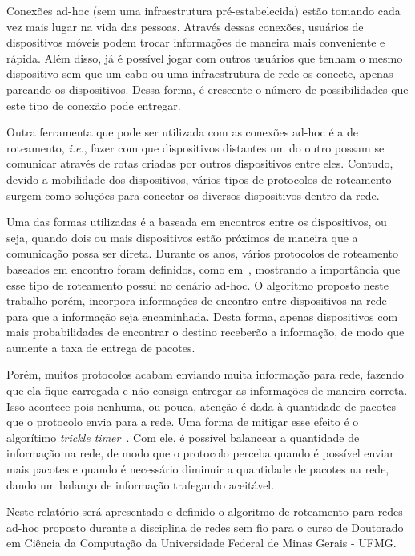 \documentclass[11pt,a4paper,titlepage]{article}
\begin{document}
Conexões ad-hoc (sem uma infraestrutura pré-estabelecida) estão tomando cada vez mais lugar na vida das pessoas.
Através dessas conexões, usuários de dispositivos móveis podem trocar informações de maneira mais conveniente e rápida.
Além disso, já é possível jogar com outros usuários que tenham o mesmo dispositivo sem que um cabo ou uma infraestrutura de rede os conecte, apenas pareando os dispositivos.
Dessa forma, é crescente o número de possibilidades que este tipo de conexão pode entregar.

Outra ferramenta que pode ser utilizada com as conexões ad-hoc é a de roteamento, \textit{i.e.}, fazer com que dispositivos distantes um do outro possam se comunicar através de rotas criadas por outros dispositivos entre eles.
Contudo, devido a mobilidade dos dispositivos, vários tipos de protocolos de roteamento surgem como soluções para conectar os diversos dispositivos dentro da rede.

Uma das formas utilizadas é a baseada em encontros entre os dispositivos, ou seja, quando dois ou mais dispositivos estão próximos de maneira que a comunicação possa ser direta.
Durante os anos, vários protocolos de roteamento baseados em encontro foram definidos, como em~\cite{Dubois, Sarafijanovic, Grossglauser, Young-Bae}, mostrando a importância que esse tipo de roteamento possui no cenário ad-hoc.
O algoritmo proposto neste trabalho porém, incorpora informações de encontro entre dispositivos na rede para que a informação seja encaminhada.
Desta forma, apenas dispositivos com mais probabilidades de encontrar o destino receberão a informação, de modo que aumente a taxa de entrega de pacotes.

Porém, muitos protocolos acabam enviando muita informação para rede, fazendo que ela fique carregada e não consiga entregar as informações de maneira correta.
Isso acontece pois nenhuma, ou pouca, atenção é dada à quantidade de pacotes que o protocolo envia para a rede.
Uma forma de mitigar esse efeito é o algorítimo \textit{trickle timer}~\cite{Trickle}.
Com ele, é possível balancear a quantidade de informação na rede, de modo que o protocolo perceba quando é possível enviar mais pacotes e quando é necessário diminuir a quantidade de pacotes na rede, dando um balanço de informação trafegando aceitável.

Neste relatório será apresentado e definido o algoritmo de roteamento para redes ad-hoc proposto durante a disciplina de redes sem fio para o curso de Doutorado em Ciência da Computação da Universidade Federal de Minas Gerais - UFMG.
\end{document}
